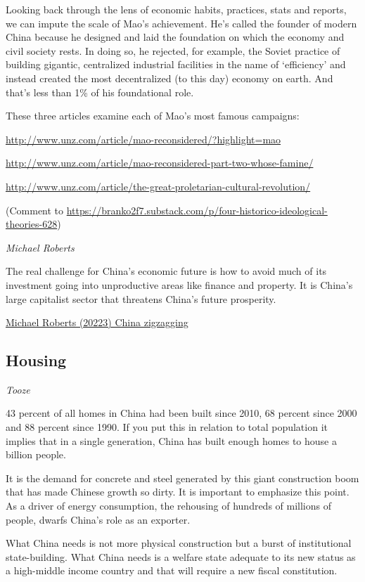 \documentclass[
]{book}
\begin{document}
Looking back through the lens of economic habits, practices, stats and reports, we can impute the scale of Mao's achievement. He's called the founder of modern China because he designed and laid the foundation on which the economy and civil society rests. In doing so, he rejected, for example, the Soviet practice of building gigantic, centralized industrial facilities in the name of `efficiency' and instead created the most decentralized (to this day) economy on earth. And that's less than 1\% of his foundational role.

These three articles examine each of Mao's most famous campaigns:

\url{http://www.unz.com/article/mao-reconsidered/?highlight=mao}

\url{http://www.unz.com/article/mao-reconsidered-part-two-whose-famine/}

\url{http://www.unz.com/article/the-great-proletarian-cultural-revolution/}

(Comment to \url{https://branko2f7.substack.com/p/four-historico-ideological-theories-628})

\emph{Michael Roberts}

The real challenge for China's economic future is how to avoid much of its
investment going into unproductive areas like finance and property.
It is China's large capitalist sector that threatens China's future prosperity.

\href{https://thenextrecession.wordpress.com/2023/01/21/china-zig-zagging/}{Michael Roberts (20223) China zigzagging}

\hypertarget{housing}{%
\subsection{Housing}\label{housing}}

\emph{Tooze}

43 percent of all homes in China had been built since 2010, 68 percent since 2000 and 88 percent since 1990. If you put this in relation to total population it implies that in a single generation, China has built enough homes to house a billion people.

It is the demand for concrete and steel generated by this giant construction boom that has made Chinese growth so dirty. It is important to emphasize this point. As a driver of energy consumption, the rehousing of hundreds of millions of people, dwarfs China's role as an exporter.

What China needs is not more physical construction but a burst of institutional state-building. What China needs is a welfare state adequate to its new status as a high-middle income country and that will require a new fiscal constitution.
\end{document}
